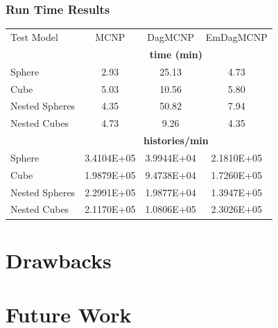 \documentclass[12pt]{beamer}
\begin{document}
\begin{frame}
\frametitle{Run Time Results}

\begin{table}
  \small
  \begin{center}


      \label{timings}
    \begin{tabular}{lccc}



      \toprule
      Test Model & MCNP & DagMCNP & EmDagMCNP \\
      & \multicolumn{3}{c}{\textbf{time (min)}} \\
      \hline
      Sphere & 2.93 & 25.13 & 4.73  \\
      Cube & 5.03 & 10.56  & 5.80 \\
      Nested Spheres & 4.35 & 50.82 & 7.94 \\
      Nested Cubes & 4.73 & 9.26 & 4.35 \\
      &  \multicolumn{3}{c}{\textbf{histories/min}} \\
      \hline
      Sphere & 3.4104E+05  & 3.9944E+04  & 2.1810E+05   \\
      Cube & 1.9879E+05 & 9.4738E+04 & 1.7260E+05 \\
      Nested Spheres & 2.2991E+05 & 1.9877E+04 & 1.3947E+05 \\
      Nested Cubes & 2.1170E+05 & 1.0806E+05 & 2.3026E+05 \\
      \bottomrule
      
    \end{tabular}
  \end{center}
\end{table}



\end{frame}

\section{Drawbacks} %
\section{Future Work} %
\end{document}
